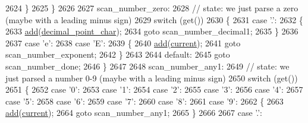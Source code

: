 \begin{DoxyCode}
2624             \}
2625         \}
2626 
2627 scan\_number\_zero:
2628         \textcolor{comment}{// state: we just parse a zero (maybe with a leading minus sign)}
2629         \textcolor{keywordflow}{switch} (\textcolor{keyword}{get}())
2630         \{
2631             \textcolor{keywordflow}{case} \textcolor{charliteral}{'.'}:
2632             \{
2633                 \hyperlink{classnlohmann_1_1detail_1_1lexer_acec899d31af1fd647911e46e8535c283}{add}(\hyperlink{classnlohmann_1_1detail_1_1lexer_a16593b0475f6d1cddd5eaf7c045771f3}{decimal\_point\_char});
2634                 \textcolor{keywordflow}{goto} scan\_number\_decimal1;
2635             \}
2636 
2637             \textcolor{keywordflow}{case} \textcolor{charliteral}{'e'}:
2638             \textcolor{keywordflow}{case} \textcolor{charliteral}{'E'}:
2639             \{
2640                 \hyperlink{classnlohmann_1_1detail_1_1lexer_acec899d31af1fd647911e46e8535c283}{add}(\hyperlink{classnlohmann_1_1detail_1_1lexer_a47169f9aaf0da4c9885e61d3109859aa}{current});
2641                 \textcolor{keywordflow}{goto} scan\_number\_exponent;
2642             \}
2643 
2644             \textcolor{keywordflow}{default}:
2645                 \textcolor{keywordflow}{goto} scan\_number\_done;
2646         \}
2647 
2648 scan\_number\_any1:
2649         \textcolor{comment}{// state: we just parsed a number 0-9 (maybe with a leading minus sign)}
2650         \textcolor{keywordflow}{switch} (\textcolor{keyword}{get}())
2651         \{
2652             \textcolor{keywordflow}{case} \textcolor{charliteral}{'0'}:
2653             \textcolor{keywordflow}{case} \textcolor{charliteral}{'1'}:
2654             \textcolor{keywordflow}{case} \textcolor{charliteral}{'2'}:
2655             \textcolor{keywordflow}{case} \textcolor{charliteral}{'3'}:
2656             \textcolor{keywordflow}{case} \textcolor{charliteral}{'4'}:
2657             \textcolor{keywordflow}{case} \textcolor{charliteral}{'5'}:
2658             \textcolor{keywordflow}{case} \textcolor{charliteral}{'6'}:
2659             \textcolor{keywordflow}{case} \textcolor{charliteral}{'7'}:
2660             \textcolor{keywordflow}{case} \textcolor{charliteral}{'8'}:
2661             \textcolor{keywordflow}{case} \textcolor{charliteral}{'9'}:
2662             \{
2663                 \hyperlink{classnlohmann_1_1detail_1_1lexer_acec899d31af1fd647911e46e8535c283}{add}(\hyperlink{classnlohmann_1_1detail_1_1lexer_a47169f9aaf0da4c9885e61d3109859aa}{current});
2664                 \textcolor{keywordflow}{goto} scan\_number\_any1;
2665             \}
2666 
2667             \textcolor{keywordflow}{case} \textcolor{charliteral}{'.'}:

\end{DoxyCode}
